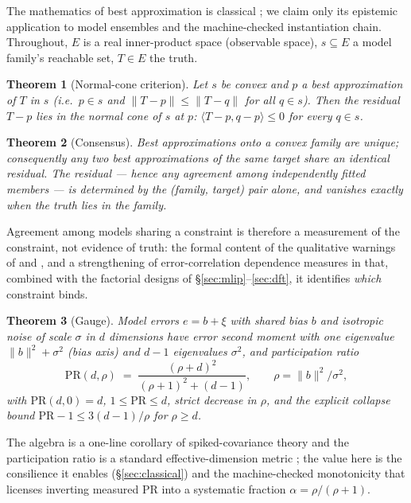 \documentclass[11pt]{article}
\newtheorem{theorem}{Theorem}
\newcommand{\inn}[2]{\langle #1, #2 \rangle}
\begin{document}
The mathematics of best approximation is classical
\citep{deutsch2001,kinderlehrer1980}; we claim only its epistemic application
to model ensembles and the machine-checked instantiation chain. Throughout,
$E$ is a real inner-product space (observable space), $s \subseteq E$ a model
family's reachable set, $T \in E$ the truth.

\begin{theorem}[Normal-cone criterion]\label{thm:cone}
Let $s$ be convex and $p$ a best approximation of $T$ in $s$
(i.e.\ $p \in s$ and $\|T-p\| \le \|T-q\|$ for all $q \in s$). Then the
residual $T - p$ lies in the normal cone of $s$ at $p$:
$\inn{T-p}{q-p} \le 0$ for every $q \in s$.
\end{theorem}

\begin{theorem}[Consensus]\label{thm:consensus}
Best approximations onto a convex family are unique; consequently any two best
approximations of the same target share an \emph{identical} residual. The
residual --- hence any agreement among independently fitted members --- is
determined by the (family, target) pair alone, and vanishes exactly when the
truth lies in the family.
\end{theorem}

Agreement among models sharing a constraint is therefore a measurement of the
constraint, not evidence of truth: the formal content of the qualitative
warnings of \citet{parker2011} and \citet{pirtle2010}, and a strengthening of
error-correlation dependence measures \citep{bishop2013} in that, combined
with the factorial designs of \S\ref{sec:mlip}--\ref{sec:dft}, it identifies
\emph{which} constraint binds.

\begin{theorem}[Gauge]\label{thm:gauge}
Model errors $e = b + \xi$ with shared bias $b$ and isotropic noise of scale
$\sigma$ in $d$ dimensions have error second moment with one eigenvalue
$\|b\|^2 + \sigma^2$ (bias axis) and $d{-}1$ eigenvalues $\sigma^2$, and
participation ratio
\[
\mathrm{PR}(d,\rho) \;=\; \frac{(\rho+d)^2}{(\rho+1)^2 + (d-1)},
\qquad \rho = \|b\|^2/\sigma^2 ,
\]
with $\mathrm{PR}(d,0)=d$, $1 \le \mathrm{PR} \le d$, strict decrease in
$\rho$, and the explicit collapse bound
$\mathrm{PR}-1 \le 3(d-1)/\rho$ for $\rho \ge d$.
\end{theorem}

The algebra is a one-line corollary of spiked-covariance theory
\citep{johnstone2001} and the participation ratio is a standard
effective-dimension metric \citep{gao2015}; the value here is the consilience
it enables (\S\ref{sec:classical}) and the machine-checked monotonicity that
licenses inverting measured PR into a systematic fraction
$\alpha = \rho/(\rho+1)$.
\end{document}
